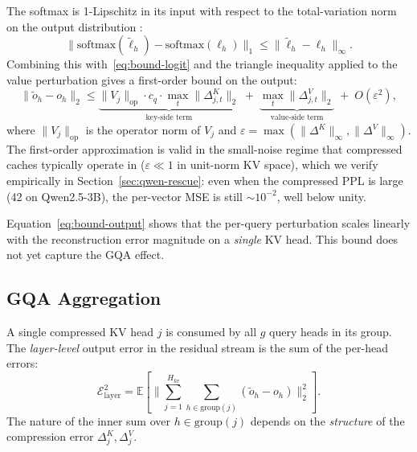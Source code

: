 \documentclass[11pt]{article}
\begin{document}
The softmax is 1-Lipschitz in its input with respect to the total-variation
norm on the output distribution \cite{gao2017properties}:
\[
\|\mathrm{softmax}(\tilde \ell_h) - \mathrm{softmax}(\ell_h)\|_1
\le \|\tilde \ell_h - \ell_h\|_\infty.
\]
Combining this with~\eqref{eq:bound-logit} and the triangle inequality applied
to the value perturbation gives a first-order bound on the output:
\begin{equation}
\label{eq:bound-output}
\|\tilde o_h - o_h\|_2
\le \underbrace{\|V_j\|_{\mathrm{op}} \cdot c_q \cdot \max_t \|\Delta^K_{j,t}\|_2}_{\text{key-side term}}
\; + \;
\underbrace{\max_t \|\Delta^V_{j,t}\|_2}_{\text{value-side term}}
\; + \; O(\varepsilon^2),
\end{equation}
where $\|V_j\|_{\mathrm{op}}$ is the operator norm of $V_j$ and
$\varepsilon = \max(\|\Delta^K\|_\infty, \|\Delta^V\|_\infty)$.
The first-order approximation is valid in the small-noise regime that
compressed caches typically operate in ($\varepsilon \ll 1$ in unit-norm KV
space), which we verify empirically in Section~\ref{sec:qwen-rescue}: even
when the compressed PPL is large (42 on Qwen2.5-3B), the per-vector MSE is
still $\sim 10^{-2}$, well below unity.

Equation~\eqref{eq:bound-output} shows that the per-query perturbation scales
linearly with the reconstruction error magnitude on a \emph{single} KV head.
This bound does not yet capture the GQA effect.

\subsection{GQA Aggregation}
\label{sec:theory-gqa}

A single compressed KV head $j$ is consumed by all $g$ query heads in its
group. The \emph{layer-level} output error in the residual stream is the sum
of the per-head errors:
\begin{equation}
\label{eq:layer-error}
\mathcal{E}_{\mathrm{layer}}^2 = \mathbb{E}\!\left[ \Big\| \sum_{j=1}^{H_{kv}} \sum_{h \in \mathrm{group}(j)} (\tilde o_h - o_h) \Big\|_2^2 \right].
\end{equation}
The nature of the inner sum over $h \in \mathrm{group}(j)$ depends on the
\emph{structure} of the compression error $\Delta^K_j, \Delta^V_j$.
\end{document}
